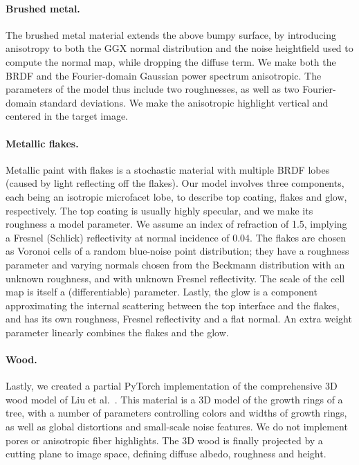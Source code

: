 \paragraph{Brushed metal.} The brushed metal material extends the above bumpy surface, by introducing anisotropy to both the GGX normal distribution and the noise heightfield used to compute the normal map, while dropping the diffuse term. We make both the BRDF and the Fourier-domain Gaussian power spectrum anisotropic. The parameters of the model thus include two roughnesses, as well as two Fourier-domain standard deviations.  We make the anisotropic highlight vertical and centered in the target image.

\paragraph{Metallic flakes.} Metallic paint with flakes is a stochastic material with multiple BRDF lobes (caused by light reflecting off the flakes). Our model involves three components, each being an isotropic microfacet lobe, to describe top coating, flakes and glow, respectively. The top coating is usually highly specular, and we make its roughness a model parameter. We assume an index of refraction of 1.5, implying a Fresnel (Schlick) reflectivity at normal incidence of 0.04. The flakes are chosen as Voronoi cells of a random blue-noise point distribution; they have a roughness parameter and varying normals chosen from the Beckmann distribution with an unknown roughness, and with unknown Fresnel reflectivity. The scale of the cell map is itself a (differentiable) parameter. Lastly, the glow is a component approximating the internal scattering between the top interface and the flakes, and has its own roughness, Fresnel reflectivity and a flat normal. An extra weight parameter linearly combines the flakes and the glow.

\paragraph{Wood.} Lastly, we created a partial PyTorch implementation of the comprehensive 3D wood model of Liu et al.~\cite{Liu2016}. This material is a 3D model of the growth rings of a tree, with a number of parameters controlling colors and widths of growth rings, as well as global distortions and small-scale noise features. We do not implement pores or anisotropic fiber highlights. The 3D wood is finally projected by a cutting plane to image space, defining diffuse albedo, roughness and height.
